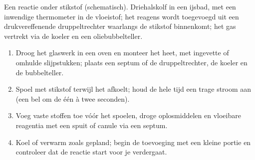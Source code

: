 \begin{omfigure}
\par\vspace{4pt}

{\small Een reactie onder stikstof (schematisch). Driehalskolf in een ijsbad, met een inwendige
thermometer in de vloeistof; het reagens wordt toegevoegd uit een drukvereffenende druppeltrechter waarlangs de
stikstof binnenkomt; het gas vertrekt via de koeler en een oliebubbelteller.}
\end{omfigure}

\begin{method}\label{met:b2:lab-techniques-2:anhydrous}
\begin{enumerate}
  \item Droog het glaswerk in een oven en monteer het heet, met ingevette of omhulde slijpstukken; plaats een septum
        of de druppeltrechter, de koeler en de bubbelteller.
  \item Spoel met stikstof terwijl het afkoelt; houd de hele tijd een trage stroom aan (een bel om de één à twee seconden).
  \item Voeg vaste stoffen toe vóór het spoelen, droge oplosmiddelen en vloeibare reagentia met een spuit of canule via een
        septum.
  \item Koel of verwarm zoals gepland; begin de toevoeging met een kleine portie en controleer dat de reactie
        start voor je verdergaat.
\end{enumerate}
\end{method}

